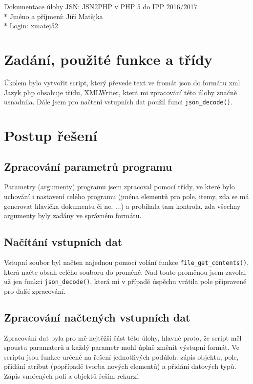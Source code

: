 \documentclass[a4paper, 10pt]{article}
\begin{document}
    \noindent
    Dokumentace úlohy JSN: JSN2PHP v PHP 5 do IPP 2016/2017 \\*
    Jméno a příjmení: Jiří Matějka \\*
    Login: xmatej52

    \section{Zadání, použité funkce a třídy}
        Úkolem bylo vytvořit script, který převede text ve fromát json do formátu
        xml. Jazyk php obsahuje třídu, XMLWriter, která mi zpracování této úlohy
        značně usnadnila. Dále jsem pro načtení vstupních dat použil funci
        \texttt{json\_decode()}.
    \section{Postup řešení}
        \subsection{Zpracování parametrů programu}
            Parametry (argumenty) programu jsem zpracoval pomocí třídy, ve které
            bylo uchování i nastavení celého programu (jména elementů pro pole,
            itemy, zda se má generovat hlavička dokumentu či ne, ...) a probíhala
            tam kontrola, zda všechny argumenty byly zadány ve správném formátu.
        \subsection{Načítání vstupních dat}
            Vstupní soubor byl načten najednou pomocí volání funkce \texttt{file\_get\_contents()},
            která načte obsah celého souboru do proměné. Nad touto proměnou jsem
            zavolal už jen funkci \texttt{json\_decode()}, která mi v případě úspěchu vrátila
            pole připravené pro další zpracování.
        \subsection{Zpracování načtených vstupních dat}
            Zpracování dat byla pro mě nejtěžší část této úlohy, hlavně proto, že
            script měl spoustu paramaterů a každý parametr mohl úplně změnit
            výstupní formát. Ve scriptu jsou funkce určené na řešení jednotlivých
            podúloh: zápis objektu, pole, přidání atribut (popřípadě tvorba nových
            elementů) a přidání datových typů. Zápis vnořených polí a objektů
            řeším rekurzí.
\end{document}
